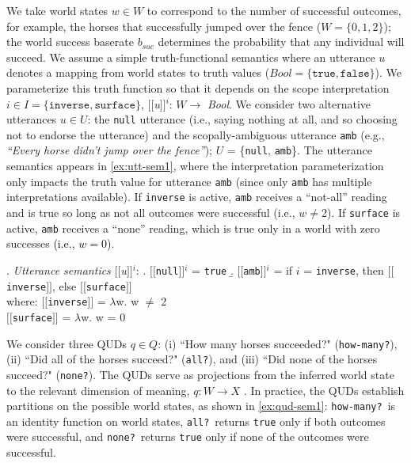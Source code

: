 \documentclass[cm]{glossa}
\newcommand{\sem}[1]{\mbox{$[\![$#1$]\!]$}}
\newcommand{\lp}[1]{\textcolor{black}{#1}} %
\begin{document}
We take world states $w\in W$ to correspond to the number of successful outcomes, for example, the horses that successfully jumped over the fence ($W=\{0,1,2\}$); the world success baserate $b_{suc}$ determines the probability that any individual will succeed. We assume a simple truth-functional semantics where an utterance $u$ denotes a mapping from world states to truth values ($Bool = \{\texttt{true},\texttt{false}\}$). We parameterize this truth function so that it depends on the scope interpretation $i \in I = \{\texttt{inverse}, \texttt{surface}\}$, \sem{\textit{u}}$^{i}$: $W\rightarrow$ \emph{Bool}. We consider two alternative utterances $u \in U$: the \texttt{null} utterance (i.e., saying nothing at all, and so choosing not to endorse the utterance) and the scopally-ambiguous utterance \texttt{amb} (e.g., \textit{``Every horse didn't jump over the fence''}); $U$ = \{\texttt{null}, \texttt{amb}\}. The utterance semantics appears in \ref{ex:utt-sem1}, where the interpretation parameterization only impacts the truth value for utterance \texttt{amb} (since only \texttt{amb} has multiple interpretations available). If \texttt{inverse} is active, \texttt{amb} receives a ``not-all'' reading and is true so long as not all outcomes were successful (i.e., $w\neq$2). If  \texttt{surface} is active, \texttt{amb} receives a ``none'' reading, which is true only in a world with zero successes \lp{(i.e., $w=0$)}.

\ex. \label{ex:utt-sem1} \emph{Utterance semantics} \sem{\textit{u}}$^{i}$:
\a. \sem{\texttt{null}}$^{i}$ = \texttt{true}
\b. \sem{\texttt{amb}}$^{i}$ = if $i$ = \texttt{inverse}, then  \sem{\texttt{inverse}}, else \sem{\texttt{surface}}\\[5pt]
 where: \sem{\texttt{inverse}} = $\lambda$w. w $\neq$ 2 \\
\phantom{where:} \sem{\texttt{surface}} = $\lambda$w. w = 0


We consider three QUDs $q \in Q$: 
(i) ``How many horses succeeded?" (\texttt{how-many?}), 
(ii) ``Did all of the horses succeed?" (\texttt{all?}), and 
(iii) ``Did none of the horses succeed?" (\texttt{none?}). 
The QUDs serve as projections from the inferred world state to the relevant dimension of meaning, $q: W \rightarrow X$ \citep*{kaoetal2014,kaoetal2014metaphor}. In practice, the QUDs establish partitions on the possible world states, as shown in \ref{ex:qud-sem1}: \texttt{how-many?}~is an identity function on world states, \texttt{all?}~returns \texttt{true} only if  both outcomes were successful, and \texttt{none?}~returns \texttt{true} only if none of the outcomes were successful.
\end{document}
